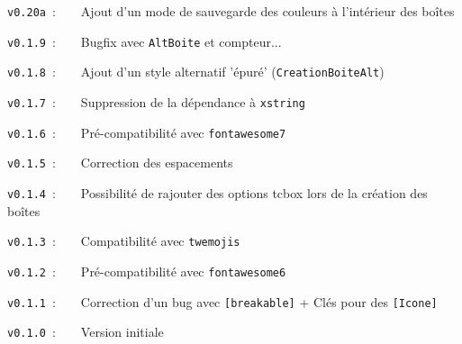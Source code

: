 \documentclass[french,11pt,a4paper]{article}
\begin{document}
\verb|v0.20a|~:~~~~Ajout d'un mode de sauvegarde des couleurs à l'intérieur des boîtes

\verb|v0.1.9|~:~~~~Bugfix avec \texttt{AltBoite} et compteur...

\verb|v0.1.8|~:~~~~Ajout d'un style alternatif 'épuré' (\texttt{CreationBoiteAlt})

\verb|v0.1.7|~:~~~~Suppression de la dépendance à \texttt{xstring}

\verb|v0.1.6|~:~~~~Pré-compatibilité avec \texttt{fontawesome7}

\verb|v0.1.5|~:~~~~Correction des espacements

\verb|v0.1.4|~:~~~~Possibilité de rajouter des options \textsf{tcbox} lors de la création des boîtes

\verb|v0.1.3|~:~~~~Compatibilité avec \texttt{twemojis}

\verb|v0.1.2|~:~~~~Pré-compatibilité avec \texttt{fontawesome6}

\verb|v0.1.1|~:~~~~Correction d'un bug avec \texttt{[breakable]} + Clés pour des \texttt{[Icone]}

\verb|v0.1.0|~:~~~~Version initiale

\vspace*{15mm}

\pagebreak
\end{document}
